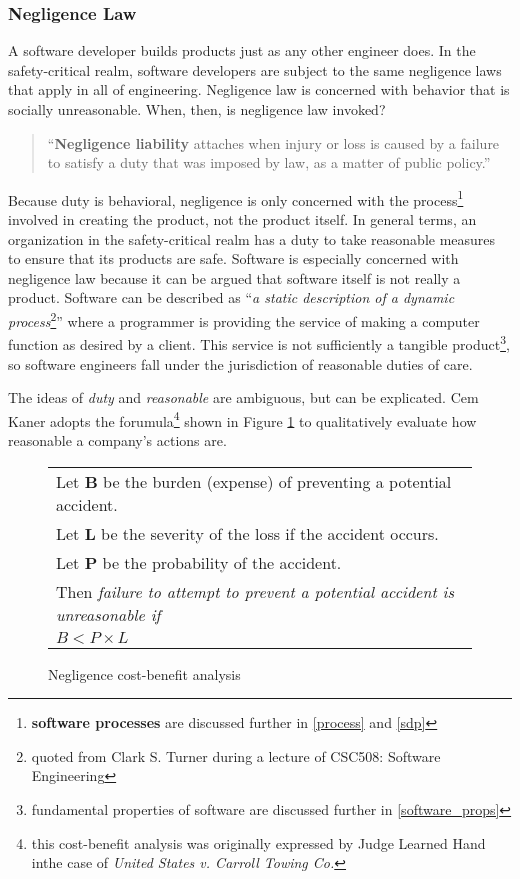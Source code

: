\subsubsection{Negligence Law}
A software developer builds products just as any other engineer does. In the
safety-critical realm, software developers are subject to the same negligence
laws that apply in all of engineering. Negligence law is concerned with behavior
that is socially unreasonable. When, then, is negligence law invoked?

\begin{quote}
``\textbf{Negligence liability} attaches when injury or loss is caused by a 
failure to satisfy a duty that was imposed by law, as a matter of public
policy.'' \cite{Kaner_neg_1995}
\end{quote}

Because duty is behavioral, negligence is only concerned with the
process\footnote{\textbf{software processes} are discussed further in
\ref{process} and \ref{sdp}} involved in creating the product, not the product
itself. In general terms, an organization in the safety-critical realm has a
duty to take reasonable measures to ensure that its products are safe. Software
is especially concerned with negligence law because it can be argued that
software itself is not really a product. Software can be described as
``\textit{a static description of a dynamic process}\footnote{quoted from Clark
S. Turner during a lecture of CSC508: Software Engineering}'' where a programmer
is providing the service of making a computer function as desired by a client.
This service is not sufficiently a tangible product\footnote{fundamental
properties of software are discussed further in \ref{software_props}}, so
software engineers fall under the jurisdiction of reasonable duties of care.

The ideas of \textit{duty} and \textit{reasonable} are ambiguous, but can be
explicated. Cem Kaner adopts the forumula\footnote{this cost-benefit analysis
was originally expressed by Judge Learned Hand inthe case of  \textit{United
States v. Carroll Towing Co.}} shown in Figure \ref{fig:negligence} to
qualitatively evaluate how reasonable a company's actions are.

\begin{figure}
\begin{tabular}{|l|}
\hline
	Let \textbf{B} be the burden (expense) of preventing a potential accident.\\
	Let \textbf{L} be the severity of the loss if the accident occurs.\\
	Let \textbf{P} be the probability of the accident.\\[6pt]
	Then \textit{failure to attempt to prevent a potential accident is 
	unreasonable if}\\[8pt]

      \centerline{\(B < P \times L\)}
\\[3pt]
\hline
\end{tabular}
\caption{Negligence cost-benefit analysis \cite{Kaner_neg_1995}}
\label{fig:negligence}
\end{figure}

